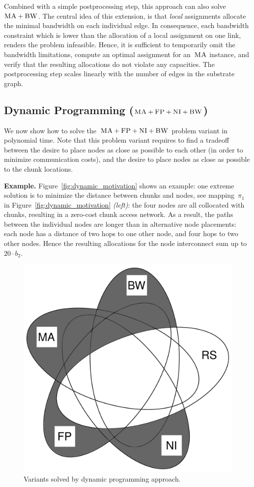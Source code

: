 \documentclass[preprint,12pt]{elsarticle}
\newcommand{\NodeMapping}{\pi}
\newcommand{\CC}{\textsc{NI}}
\newcommand{\FP}{\textsc{FP}}
\newcommand{\BW}{\textsc{BW}}
\newcommand{\MA}{\textsc{MA}}
\newcommand{\CostCom}{\ensuremath{b_2}}
\begin{document}
Combined with a simple postprocessing step, this approach can also solve~$\MA+\BW$. The central idea of this extension, is
that \emph{local} assignments allocate the minimal bandwidth
on each individual edge. In consequence, each bandwidth constraint
which is lower than the allocation of a local assignment on one link, renders
the problem infeasible. Hence, it is sufficient to temporarily omit the
bandwidth limitations, compute an optimal assignment for an~$\MA$ instance, and
verify that the resulting allocations do not violate any capacities. The
postprocessing step scales linearly with the number of edges in the substrate
graph.



\subsection{Dynamic Programming ($\MA+\FP+\CC+\BW$)}\label{ssec:dyn}

We now show how to solve the~$\MA+\FP+\CC+\BW$ problem variant
in polynomial time.
Note that this problem variant requires to find a
tradeoff between the desire to place nodes as close as possible to each other
(in order to minimize communication costs), and the desire to place nodes
as close as possible to
the chunk locations.




\textbf{Example.} Figure~\ref{fig:dynamic_motivation} shows an example: one
extreme solution is to minimize the distance between chunks and nodes,
see mapping~$\NodeMapping_1$ in
Figure~\ref{fig:dynamic_motivation} \emph{(left)}: the four nodes are all
collocated with chunks, resulting in a zero-cost chunk access network. As a
result, the paths between the individual nodes are longer than in alternative
node placements: each node has a distance of two hops to one other node,
and four hops to two other nodes. Hence the resulting allocations for the
node interconnect sum up to~$20 \cdot \CostCom$.

\begin{figure}[t]
\centering
\includegraphics[width=0.49\columnwidth]{figs/venn_dp.pdf}
\caption{Variants solved by dynamic programming approach.}
\vspace{-1em}
\label{fig:venn_flow}
\end{figure}
\end{document}
